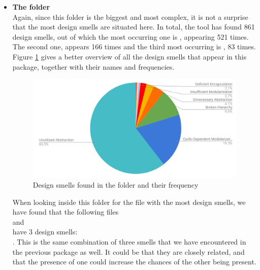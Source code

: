 \begin{itemize}
            \item \textbf{The  folder}\\
            Again, since this folder is the biggest and most complex, it is not a surprise that the most design smells are situated here. In total, the tool has found 861 design smells, out of which the most occurring one is , appearing 521 times. The second one,  appears 166 times and the third most occurring is , 83 times. Figure \ref{fig:impldesignsmells} gives a better overview of all the design smells that appear in this package, together with their names and frequencies.
            \begin{figure}[H]
                \centering
                \includegraphics[scale=0.7]{figures/step4/designsmellimpl.PNG}
                \caption{Design smells found in the  folder and their frequency}
                \label{fig:impldesignsmells}
            \end{figure}
            When looking inside this folder for the file with the most design smells, we have found that the following files\\ 
             and \\
             have 3 design smells: \\
            . This is the same combination of three smells that we have encountered in the previous package as well. It could be that they are closely related, and that the presence of one could increase the chances of the other being present. 
        \end{itemize}
        
